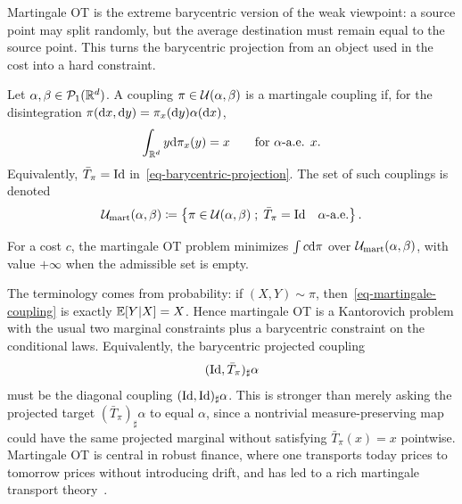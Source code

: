 Martingale OT is the extreme barycentric version of the weak viewpoint: a source point may split randomly, but the average destination must remain equal to the source point. This turns the barycentric projection from an object used in the cost into a hard constraint.

\begin{defn}\label{def-martingale-coupling}
	Let $\alpha,\beta\in\mathcal{P}_1(\mathbb{R}^d)$. A coupling $\pi\in\mathcal{U}(\alpha,\beta)$ is a martingale coupling if, for the disintegration $\pi(\mathrm{d} x,\mathrm{d} y)=\pi_x(\mathrm{d} y)\alpha(\mathrm{d} x)$,
	\begin{equation}\label{eq-martingale-coupling}
		\int_{\mathbb{R}^d}y\mathrm{d}\pi_x(y)=x
		\qquad\text{for $\alpha$-a.e. }x .
	\end{equation}
	Equivalently, $\bar T_\pi=\mathrm{Id}$ in~\eqref{eq-barycentric-projection}. The set of such couplings is denoted
	\[
		\mathcal{U}_{\mathrm{mart}}(\alpha,\beta)
		\coloneqq
		\left\{ \pi\in\mathcal{U}(\alpha,\beta) \;;\; \bar T_\pi=\mathrm{Id}\quad\alpha\text{-a.e.} \right\}.
	\]
\end{defn}

For a cost $c$, the martingale OT problem minimizes $\int c\mathrm{d}\pi$ over $\mathcal{U}_{\mathrm{mart}}(\alpha,\beta)$, with value $+\infty$ when the admissible set is empty.

The terminology comes from probability: if $(X,Y)\sim\pi$, then~\eqref{eq-martingale-coupling} is exactly $\mathbb{E}[Y|X]=X$. Hence martingale OT is a Kantorovich problem with the usual two marginal constraints plus a barycentric constraint on the conditional laws. Equivalently, the barycentric projected coupling
\[
	(\mathrm{Id},\bar T_\pi)_\sharp\alpha
\]
must be the diagonal coupling $(\mathrm{Id},\mathrm{Id})_\sharp\alpha$. This is stronger than merely asking the projected target $(\bar T_\pi)_\sharp\alpha$ to equal $\alpha$, since a nontrivial measure-preserving map could have the same projected marginal without satisfying $\bar T_\pi(x)=x$ pointwise. Martingale OT is central in robust finance, where one transports today prices to tomorrow prices without introducing drift, and has led to a rich martingale transport theory~\cite{beiglbock2013model,GalichonMartingale,dolinsky2014martingale,guo2017computational}.

